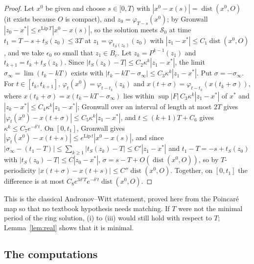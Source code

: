 \documentclass[11pt]{article}
\theoremstyle{definition}
\begin{document}
\begin{proof}
Let $x^0$ be given and choose $s \in [0, T)$ with $|x^0 - x(s)| = \operatorname{dist}(x^0, O)$ (it exists because $O$ is compact), and $z_0 = \varphi_{T-s}(x^0)$; by Gronwall $|z_0 - x^*| \le e^{\mathrm{Lip}\,T}|x^0 - x(s)|$, so the solution meets $\mathcal S_0$ at time $t_1 = T - s + t_S(z_0) \le 3T$ at $z_1 = \varphi_{t_S(z_0)}(z_0)$ with $|z_1 - x^*| \le C_1\operatorname{dist}(x^0, O)$, and we take $\epsilon_0$ so small that $z_1 \in B_c$. Let $z_k = P^{k-1}(z_1)$ and $t_{k+1} = t_k + t_S(z_k)$. Since $|t_S(z_k) - T| \le C_2\kappa^k|z_1 - x^*|$, the limit $\sigma_\infty = \lim(t_k - kT)$ exists with $|t_k - kT - \sigma_\infty| \le C_3\kappa^k|z_1 - x^*|$. Put $\sigma = -\sigma_\infty$. For $t \in [t_k, t_{k+1}]$, $\varphi_t(x^0) = \varphi_{t-t_k}(z_k)$ and $x(t + \sigma) = \varphi_{t-t_k}(x(t_k + \sigma))$, where $x(t_k + \sigma) = x(t_k - kT - \sigma_\infty)$ lies within $\sup|F|\,C_3\kappa^k|z_1 - x^*|$ of $x^*$ and $|z_k - x^*| \le C_4\kappa^k|z_1 - x^*|$; Gronwall over an interval of length at most $2T$ gives $|\varphi_t(x^0) - x(t + \sigma)| \le C_5\kappa^k|z_1 - x^*|$, and $t \le (k+1)T + C_6$ gives $\kappa^k \le C_7e^{-\delta't}$. On $[0, t_1]$, Gronwall gives $|\varphi_t(x^0) - x(t + s)| \le e^{\mathrm{Lip}\,t}|x^0 - x(s)|$, and since $|\sigma_\infty - (t_1 - T)| \le \sum_{k\ge1}|t_S(z_k) - T| \le C'|z_1 - x^*|$ and $t_1 - T = -s + t_S(z_0)$ with $|t_S(z_0) - T| \le C|z_0 - x^*|$, $\sigma = s - T + O(\operatorname{dist}(x^0, O))$, so by $T$-periodicity $|x(t + \sigma) - x(t + s)| \le C''\operatorname{dist}(x^0, O)$. Together, on $[0, t_1]$ the difference is at most $C_8e^{3\delta'T}e^{-\delta't}\operatorname{dist}(x^0, O)$.
\end{proof}

This is the classical Andronov--Witt statement, proved here from the Poincar\'e map so that no textbook hypothesis needs matching. If $T$ were not the minimal period of the ring solution, (i) to (iii) would still hold with respect to $T$; Lemma~\ref{lem:real} shows that it is minimal.

\subsection{The computations}\label{sec:stabcomp}
\end{document}
